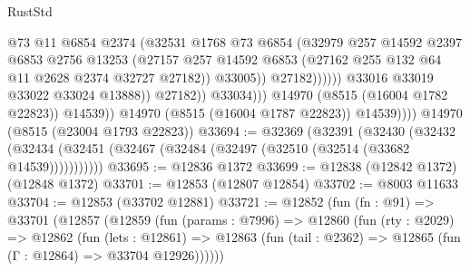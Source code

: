 \begin{lexlean}{RustStd}
\begin{coremodule}
                                          @73
                                          @11
                                          @6854
                                          @2374
                                          (@32531
                                            @1768
                                            @73
                                            @6854
                                            (@32979
                                              @257
                                              @14592
                                              @2397
                                              @6853
                                              @2756
                                              @13253
                                              (@27157
                                                @257
                                                @14592
                                                @6853
                                                (@27162
                                                  @255
                                                  @132
                                                  @64
                                                  @11
                                                  @2628
                                                  @2374
                                                  @32727
                                                  @27182))
                                              @33005))
                                          @27182))))))
                              @33016
                              @33019
                              @33022
                              @33024
                              @13888))
                          @27182))
                      @33034)))
                @14970
                (@8515 (@16004 @1782 @22823))
                @14539))
            @14970
            (@8515 (@16004 @1787 @22823))
            @14539))))
    @14970
    (@8515 (@23004 @1793 @22823))
@33694 := @32369
    (@32391
      (@32430
        (@32432 (@32434 (@32451 (@32467 (@32484 (@32497 (@32510 (@32514 (@33682 @14539)))))))))))
@33695 := @12836 @1372
@33699 := @12838 (@12842 @1372) (@12848 @1372)
@33701 := @12853 (@12807 @12854)
@33702 := @8003 @11633
@33704 := @12853 (@33702 @12881)
@33721 := @12852
    (fun (fn : @91) =>
    @33701
      (@12857
        (@12859
          (fun (params : @7996) =>
          @12860
            (fun (rty : @2029) =>
            @12862
              (fun (lets : @12861) =>
              @12863 (fun (tail : @2362) => @12865 (fun (Γ : @12864) => @33704 @12926))))))

\end{coremodule}
\end{lexlean}

